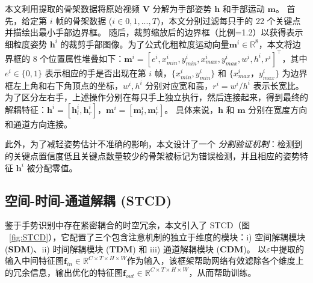 本文利用提取的骨架数据将原始视频 $\mathbf{V}$ 分解为手部姿势 $\mathbf{h}$ 和手部运动 $\mathbf{m}$。
首先，给定第 $i$ 帧的骨架数据 ($i \in 0, 1, ..., T$)，本文分别过滤每只手的 22 个关键点并描绘出最小手部边界框。
随后，裁剪缩放后的边界框（比例=1.2）以获得表示细粒度姿势 $\mathbf{h}^{i}$ 的裁剪手部图像。为了公式化粗粒度运动向量$\mathbf{m}^{i} \in \mathbb{R}^{8}$，本文将边界框的 8 个位置属性堆叠如下：$\mathbf{m}^{i} = \left[e^{i}, x^{i}_{min}, y^{i}_{min}, x^{i}_{max}, y^{i}_{max}, w^{i}, h^{i}, r^{i}\right]^{\top}$，其中 $e^{i} \in \{0, 1\}$ 表示相应的手是否出现在第 $i$ 帧，$\{x^{i}_{min}, y^{i}_{min}\}$ 和 $\{x^{i}_{max}， y^{i}_{max}\}$ 为边界框左上角和右下角顶点的坐标，$w^{i}, h^{i}$ 分别对应宽和高，$r^{i}=w^{i}/h^{i}$ 表示长宽比。
为了区分左右手，上述操作分别在每只手上独立执行，然后连接起来，得到最终的解耦特征：$\mathbf{h}^{i} = \left[\mathbf{h}^{i}_l, \mathbf{h}^{i}_r\right]$，$\mathbf{m}^{i} = \left[\mathbf{m}^{i}_l, \mathbf{m}^{i}_r\right]$。
具体来说，$\mathbf{h}$ 和 $\mathbf{m}$ 分别在宽度方向和通道方向连接。

此外，为了减轻姿势估计不准确的影响，本文设计了一个 \emph{分割验证机制}：检测到的关键点置信度低且关键点数量较少的骨架被标记为错误检测，并且相应的姿势特征 $\mathbf{h}^{i}$ 被分配零值。%

\subsection{空间-时间-通道解耦 (STCD)}
\label{sec:STCD}
鉴于手势识别中存在紧密耦合的时空冗余\cite{zhou2023unified}，本文引入了 STCD（图 ~\ref{fig:STCD}），它配置了三个包含注意机制的独立于维度的模块：i) 空间解耦模块 (\textbf{SDM})、ii) 时间解耦模块 (\textbf{TDM}) 和 iii) 通道解耦模块 (\textbf{CDM})。
以$\varepsilon$中提取的输入中间特征图$\mathbf{f}_{in}\in \mathbb{R}^{C\times T\times H\times W}$作为输入，该框架帮助网络有效滤除各个维度上的冗余信息，输出优化的特征图$\mathbf{f}_{out}\in \mathbb{R}^{C\times T\times H\times W}$，从而帮助训练。

